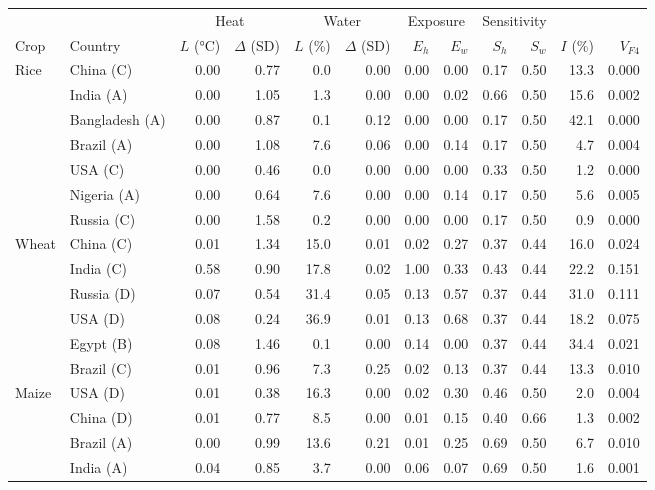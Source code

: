 \begin{tabular}{llrrrrrrrrrr}
\toprule
 & & \multicolumn{2}{c}{Heat} & \multicolumn{2}{c}{Water} & \multicolumn{2}{c}{Exposure} & \multicolumn{2}{c}{Sensitivity} & & \\
\cmidrule(lr){3-4}\cmidrule(lr){5-6}\cmidrule(lr){7-8}\cmidrule(lr){9-10}
Crop & Country & $L$ (\si{\celsius}) & $\Delta$ (SD) & $L$ (\%) & $\Delta$ (SD) & $E_h$ & $E_w$ & $S_h$ & $S_w$ & $I$ (\%) & $V_{F4}$\\
\midrule
Rice & China (C) & 0.00 & 0.77 & 0.0 & 0.00 & 0.00 & 0.00 & 0.17 & 0.50 & 13.3 & 0.000 \\
 & India (A) & 0.00 & 1.05 & 1.3 & 0.00 & 0.00 & 0.02 & 0.66 & 0.50 & 15.6 & 0.002 \\
 & Bangladesh (A) & 0.00 & 0.87 & 0.1 & 0.12 & 0.00 & 0.00 & 0.17 & 0.50 & 42.1 & 0.000 \\
 & Brazil (A) & 0.00 & 1.08 & 7.6 & 0.06 & 0.00 & 0.14 & 0.17 & 0.50 & 4.7 & 0.004 \\
 & USA (C) & 0.00 & 0.46 & 0.0 & 0.00 & 0.00 & 0.00 & 0.33 & 0.50 & 1.2 & 0.000 \\
 & Nigeria (A) & 0.00 & 0.64 & 7.6 & 0.00 & 0.00 & 0.14 & 0.17 & 0.50 & 5.6 & 0.005 \\
 & Russia (C) & 0.00 & 1.58 & 0.2 & 0.00 & 0.00 & 0.00 & 0.17 & 0.50 & 0.9 & 0.000 \\
\midrule
Wheat & China (C) & 0.01 & 1.34 & 15.0 & 0.01 & 0.02 & 0.27 & 0.37 & 0.44 & 16.0 & 0.024 \\
 & India (C) & 0.58 & 0.90 & 17.8 & 0.02 & 1.00 & 0.33 & 0.43 & 0.44 & 22.2 & 0.151 \\
 & Russia (D) & 0.07 & 0.54 & 31.4 & 0.05 & 0.13 & 0.57 & 0.37 & 0.44 & 31.0 & 0.111 \\
 & USA (D) & 0.08 & 0.24 & 36.9 & 0.01 & 0.13 & 0.68 & 0.37 & 0.44 & 18.2 & 0.075 \\
 & Egypt (B) & 0.08 & 1.46 & 0.1 & 0.00 & 0.14 & 0.00 & 0.37 & 0.44 & 34.4 & 0.021 \\
 & Brazil (C) & 0.01 & 0.96 & 7.3 & 0.25 & 0.02 & 0.13 & 0.37 & 0.44 & 13.3 & 0.010 \\
\midrule
Maize & USA (D) & 0.01 & 0.38 & 16.3 & 0.00 & 0.02 & 0.30 & 0.46 & 0.50 & 2.0 & 0.004 \\
 & China (D) & 0.01 & 0.77 & 8.5 & 0.00 & 0.01 & 0.15 & 0.40 & 0.66 & 1.3 & 0.002 \\
 & Brazil (A) & 0.00 & 0.99 & 13.6 & 0.21 & 0.01 & 0.25 & 0.69 & 0.50 & 6.7 & 0.010 \\
 & India (A) & 0.04 & 0.85 & 3.7 & 0.00 & 0.06 & 0.07 & 0.69 & 0.50 & 1.6 & 0.001 \\

\end{tabular}
